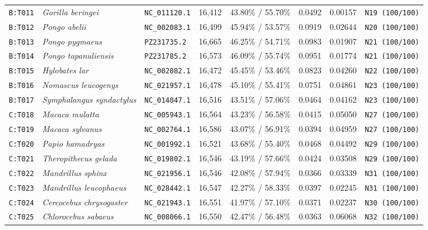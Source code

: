 \documentclass[10pt,letterpaper]{article}
\begin{document}
\begin{longtable}{llllllll}
\texttt{B:T011} & \textit{Gorilla beringei} & \texttt{NC\_011120.1} & 16,412 & 43.80\% / 55.70\% & 0.0492 & 0.00157 & \texttt{N19 (100/100)} \\
\texttt{B:T012} & \textit{Pongo abelii} & \texttt{NC\_002083.1} & 16,499 & 45.94\% / 53.57\% & 0.0919 & 0.02644 & \texttt{N20 (100/100)} \\
\texttt{B:T013} & \textit{Pongo pygmaeus} & \texttt{PZ231735.2} & 16,665 & 46.25\% / 54.71\% & 0.0983 & 0.01907 & \texttt{N21 (100/100)} \\
\texttt{B:T014} & \textit{Pongo tapanuliensis} & \texttt{PZ231785.2} & 16,573 & 46.09\% / 55.74\% & 0.0951 & 0.01774 & \texttt{N21 (100/100)} \\
\texttt{B:T015} & \textit{Hylobates lar} & \texttt{NC\_002082.1} & 16,472 & 45.45\% / 53.46\% & 0.0823 & 0.04260 & \texttt{N22 (100/100)} \\
\texttt{B:T016} & \textit{Nomascus leucogenys} & \texttt{NC\_021957.1} & 16,478 & 45.10\% / 55.41\% & 0.0751 & 0.04861 & \texttt{N23 (100/100)} \\
\texttt{B:T017} & \textit{Symphalangus syndactylus} & \texttt{NC\_014047.1} & 16,516 & 43.51\% / 57.06\% & 0.0464 & 0.04162 & \texttt{N23 (100/100)} \\
\texttt{C:T018} & \textit{Macaca mulatta} & \texttt{NC\_005943.1} & 16,564 & 43.23\% / 56.58\% & 0.0415 & 0.05050 & \texttt{N27 (100/100)} \\
\texttt{C:T019} & \textit{Macaca sylvanus} & \texttt{NC\_002764.1} & 16,586 & 43.07\% / 56.91\% & 0.0394 & 0.04959 & \texttt{N27 (100/100)} \\
\texttt{C:T020} & \textit{Papio hamadryas} & \texttt{NC\_001992.1} & 16,521 & 43.68\% / 55.40\% & 0.0468 & 0.04492 & \texttt{N29 (100/100)} \\
\texttt{C:T021} & \textit{Theropithecus gelada} & \texttt{NC\_019802.1} & 16,546 & 43.19\% / 57.66\% & 0.0424 & 0.03508 & \texttt{N29 (100/100)} \\
\texttt{C:T022} & \textit{Mandrillus sphinx} & \texttt{NC\_021956.1} & 16,546 & 42.08\% / 57.94\% & 0.0366 & 0.03339 & \texttt{N31 (100/100)} \\
\texttt{C:T023} & \textit{Mandrillus leucophaeus} & \texttt{NC\_028442.1} & 16,547 & 42.27\% / 58.33\% & 0.0397 & 0.02245 & \texttt{N31 (100/100)} \\
\texttt{C:T024} & \textit{Cercocebus chrysogaster} & \texttt{NC\_021943.1} & 16,551 & 41.97\% / 57.10\% & 0.0371 & 0.02237 & \texttt{N30 (100/100)} \\
\texttt{C:T025} & \textit{Chlorocebus sabaeus} & \texttt{NC\_008066.1} & 16,550 & 42.47\% / 56.48\% & 0.0363 & 0.06068 & \texttt{N32 (100/100)} \\

\end{longtable}
\end{document}
